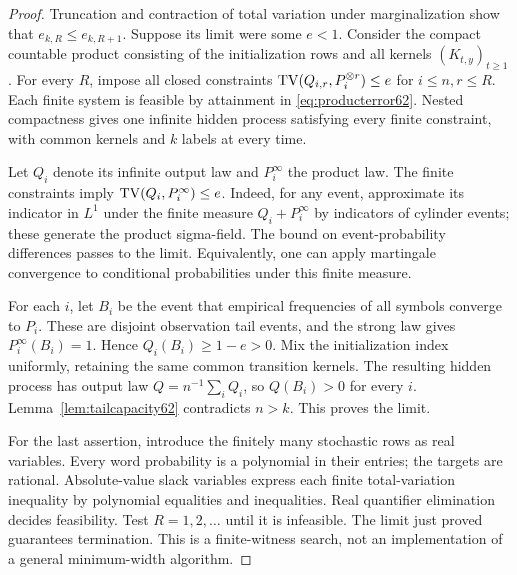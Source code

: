 \begin{proof}
Truncation and contraction of total variation under marginalization
show that $e_{k,R}\le e_{k,R+1}$. Suppose its limit were some $e<1$.
Consider the compact countable product consisting of the initialization
rows and all kernels $(K_{t,y})_{t\ge1}$. For every $R$, impose all
closed constraints
$\operatorname{TV}(Q_{i,r},P_i^{\otimes r})\le e$ for $i\le n,r\le R$.
Each finite system is feasible by attainment in \eqref{eq:producterror62}.
Nested compactness gives one infinite hidden process satisfying every
finite constraint, with common kernels and $k$ labels at every time.

Let $Q_i$ denote its infinite output law and $P_i^\infty$ the product
law. The finite constraints imply $\operatorname{TV}(Q_i,P_i^\infty)\le e$.
Indeed, for any event, approximate its indicator in $L^1$ under the
finite measure $Q_i+P_i^\infty$ by indicators of cylinder events;
these generate the product sigma-field. The bound on event-probability
differences passes to the limit. Equivalently, one can apply martingale
convergence to conditional probabilities under this finite measure.

For each $i$, let $B_i$ be the event that empirical frequencies of all
symbols converge to $P_i$. These are disjoint observation tail events,
and the strong law gives $P_i^\infty(B_i)=1$. Hence
$Q_i(B_i)\ge1-e>0$. Mix the initialization index uniformly, retaining
the same common transition kernels. The resulting hidden process has
output law $Q=n^{-1}\sum_iQ_i$, so $Q(B_i)>0$ for every $i$.
Lemma~\ref{lem:tailcapacity62} contradicts $n>k$. This proves the limit.

For the last assertion, introduce the finitely many stochastic rows as
real variables. Every word probability is a polynomial in their entries;
the targets are rational. Absolute-value slack variables express each
finite total-variation inequality by polynomial equalities and
inequalities. Real quantifier elimination decides feasibility. Test
$R=1,2,\ldots$ until it is infeasible. The limit just proved guarantees
termination. This is a finite-witness search, not an implementation of a
general minimum-width algorithm.
\end{proof}

